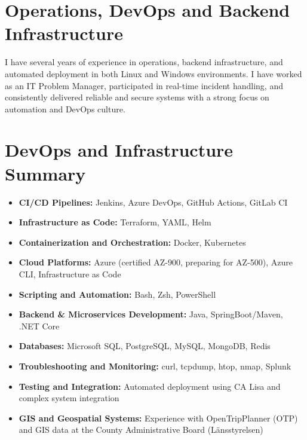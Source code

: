\section*{Operations, DevOps and Backend Infrastructure}

I have several years of experience in operations, backend infrastructure, and automated deployment in both Linux and Windows environments. I have worked as an IT Problem Manager, participated in real-time incident handling, and consistently delivered reliable and secure systems with a strong focus on automation and DevOps culture.

\section*{DevOps and Infrastructure Summary}
\begin{itemize}
  \item \textbf{CI/CD Pipelines:} Jenkins, Azure DevOps, GitHub Actions, GitLab CI
  \item \textbf{Infrastructure as Code:} Terraform, YAML, Helm
  \item \textbf{Containerization and Orchestration:} Docker, Kubernetes
  \item \textbf{Cloud Platforms:} Azure (certified AZ-900, preparing for AZ-500), Azure CLI, Infrastructure as Code
  \item \textbf{Scripting and Automation:} Bash, Zsh, PowerShell
  \item \textbf{Backend \& Microservices Development:} Java, SpringBoot/Maven, .NET Core
  \item \textbf{Databases:} Microsoft SQL, PostgreSQL, MySQL, MongoDB, Redis
  \item \textbf{Troubleshooting and Monitoring:} curl, tcpdump, htop, nmap, Splunk
  \item \textbf{Testing and Integration:} Automated deployment using CA Lisa and complex system integration
  \item \textbf{GIS and Geospatial Systems:} Experience with OpenTripPlanner (OTP) and GIS data at the County Administrative Board (Länsstyrelsen)
\end{itemize}
